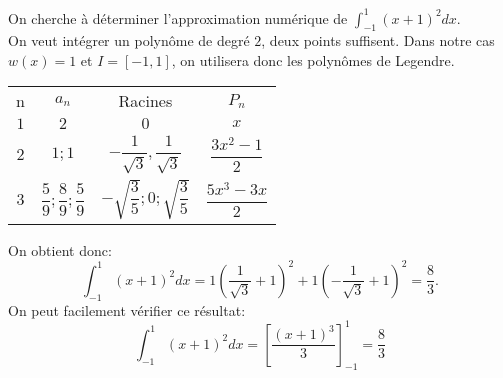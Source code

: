 \bex
$ $\\
On cherche à déterminer l'approximation numérique de $\displaystyle{\int_{-1}^1{(x+1)^2dx}}$.
\\On veut intégrer un polynôme de degré $2$, deux points suffisent. Dans notre cas $w(x)=1$ et $I=[-1,1]$, on utilisera donc les polynômes de Legendre.
\begin{center}
\begin{tabular}{cccc}
n & $a_n$ & Racines & $P_n$ \\
$1$ & $2$ & $0$ & $x$ \\
$2$ & $1;1$ & $-\dfrac{1}{\sqrt{3}},\dfrac{1}{\sqrt{3}}$ & $\dfrac{3x^2-1}{2}$\\
$3$ & $\dfrac{5}{9};\dfrac{8}{9};\dfrac{5}{9}$ & $-\sqrt{\dfrac{3}{5}};0;\sqrt{\dfrac{3}{5}}$ & $\dfrac{5x^3-3x}{2}$\\
\end{tabular}
\end{center}
On obtient donc:$$\int_{-1}^1{(x+1)^2dx}=1\left(\dfrac{1}{\sqrt{3}}+1\right)^2+1\left(-\dfrac{1}{\sqrt{3}}+1\right)^2=\dfrac{8}{3}.$$
On peut facilement vérifier ce résultat:
$$\int_{-1}^1{(x+1)^2dx}=\left[\dfrac{(x+1)^3}{3}\right]^1_{-1}=\dfrac{8}{3}$$
\eex

